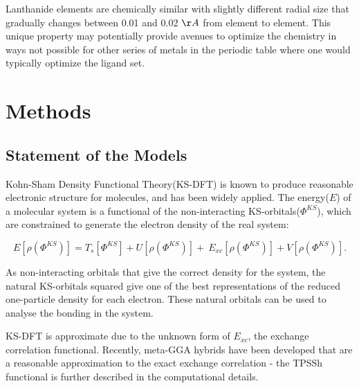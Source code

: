 \documentclass[11pt]{article}
\begin{document}
Lanthanide elements are chemically similar with slightly different radial
size that gradually changes between 0.01 and 0.02 $\AA$  from element to element.
This unique property may potentially provide avenues to optimize the chemistry
in ways not possible for other series of metals in the periodic table where
one would typically optimize the ligand set.

%

\section{Methods}

\subsection{Statement of the Models}

Kohn-Sham Density Functional Theory(KS-DFT) is known to produce
reasonable electronic structure for molecules, and has been
widely applied. The energy($E$) of a molecular system is a functional
of the non-interacting KS-orbitals($\Phi^{KS}$), which are constrained to 
generate the electron density of the real system:

\begin{equation}
  \label{eq:KSDFT}
  E[\rho(\Phi^{KS})] = T_s[\Phi^{KS}] + U[\rho(\Phi^{KS})] +\
  E_{xc}[\rho(\Phi^{KS})] + V[\rho(\Phi^{KS})].
\end{equation}

As non-interacting orbitals that give the correct density for the
system, the natural KS-orbitals squared give 
one of the best representations of
the reduced one-particle density for each electron.
These natural orbitals can be used to analyse the bonding in the
system.

KS-DFT is approximate due to the unknown form of $E_{xc}$, the
exchange correlation functional. Recently, meta-GGA hybrids have
been developed that are a reasonable approximation to the exact
exchange correlation - the TPSSh functional is further described
in the computational details.
\end{document}
